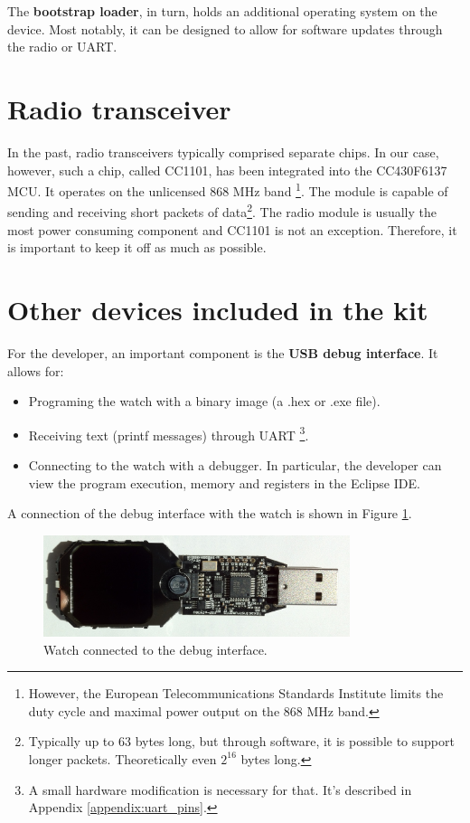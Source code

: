 The {\bf bootstrap loader}, in turn, holds an additional operating
system on the device.  Most notably, it can be designed to allow for
software updates through the radio or UART.

\section{Radio transceiver}

In the past, radio transceivers typically comprised separate chips. In
our case, however, such a chip, called CC1101, has been integrated into
the CC430F6137 MCU.  It operates on the unlicensed 868 MHz band
\footnote{However, the European Telecommunications Standards Institute
limits the duty cycle and maximal power output on the 868 MHz band.}.
The module is capable of sending and receiving short packets of
data\footnote{Typically up to 63 bytes long, but through software, it
is possible to support longer packets. Theoretically even $2^{16}$
bytes long.}.  The radio module is usually the most power consuming
component and CC1101 is not an exception. Therefore, it is important
to keep it off as much as possible.

\section{Other devices included in the kit}

For the developer, an important component is the {\bf USB debug
interface}. It allows for:
\begin{itemize}
  \item Programing the watch with a binary image (a .hex or .exe file).
  \item Receiving text (printf messages) through UART \footnote{A small
    hardware modification is necessary for that. It's described in
    Appendix \ref{appendix:uart_pins}.}.
  \item Connecting to the watch with a debugger. In particular, the
    developer can view the program execution, memory and registers in
    the Eclipse IDE.
\end{itemize}
A connection of the debug interface with the watch is shown in Figure
\ref{fig:chronos_dongle}.

\begin{figure}[h]
  \centering
  \includegraphics[width=0.8\textwidth]{img/chronos_dongle.jpg}
  \caption{Watch connected to the debug interface.}
  \label{fig:chronos_dongle}
\end{figure}

